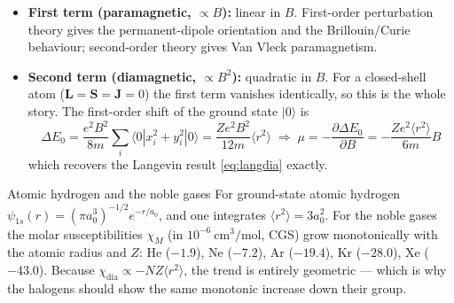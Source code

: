\documentclass[11pt,a4paper]{article}
\newcommand{\vb}[1]{\mathbf{#1}}
\begin{document}
\begin{itemize}[leftmargin=1.6cm]
    \item \textbf{First term (paramagnetic, $\propto B$):} linear in $B$. First-order perturbation theory gives the permanent-dipole orientation and the Brillouin/Curie behaviour; second-order theory gives Van Vleck paramagnetism.
    \item \textbf{Second term (diamagnetic, $\propto B^2$):} quadratic in $B$. For a closed-shell atom ($\vb{L}=\vb{S}=\vb{J}=0$) the first term vanishes identically, so this is the whole story. The first-order shift of the ground state $|0\rangle$ is
    \begin{equation}
        \Delta E_0 = \frac{e^2B^2}{8m}\sum_i\langle 0|x_i^2+y_i^2|0\rangle
        = \frac{Ze^2B^2}{12m}\langle r^2\rangle
        \;\Longrightarrow\;
        \mu = -\frac{\partial\Delta E_0}{\partial B} = -\frac{Ze^2\langle r^2\rangle}{6m}B
        \label{eq:diafirstorder}
    \end{equation}
    which recovers the Langevin result \eqref{eq:langdia} exactly.
\end{itemize}

\begin{sketchbox}{Atomic hydrogen and the noble gases}
For ground-state atomic hydrogen $\psi_{1s}(r) = (\pi a_0^3)^{-1/2}e^{-r/a_0}$, and one integrates $\langle r^2\rangle = 3a_0^2$. For the noble gases the molar susceptibilities $\chi_M$ (in $10^{-6}\ \mathrm{cm^3/mol}$, CGS) grow monotonically with the atomic radius and $Z$: He ($-1.9$), Ne ($-7.2$), Ar ($-19.4$), Kr ($-28.0$), Xe ($-43.0$). Because $\chi_{\mathrm{dia}} \propto -NZ\langle r^2\rangle$, the trend is entirely geometric --- which is why the halogens should show the same monotonic increase down their group.
\end{sketchbox}
\end{document}
